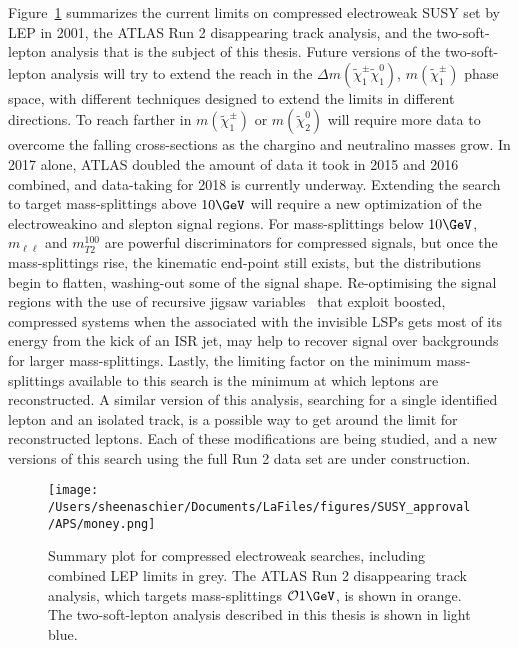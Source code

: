Figure~\ref{fig:final} summarizes the current limits on compressed electroweak SUSY set by LEP in 2001, the ATLAS Run 2 disappearing track analysis, and the two-soft-lepton analysis that is the subject of this thesis.  Future versions of the two-soft-lepton analysis will try to extend the reach in the $\Delta m(\tilde\chi_1^\pm\tilde\chi_1^0)$, $m(\tilde\chi_1^\pm)$ phase space, with different techniques designed to extend the limits in different directions.  To reach farther in $m(\tilde\chi_1^\pm)$ or $m(\tilde\chi_2^0)$ will require more data to overcome the falling cross-sections as the chargino and neutralino masses grow.  In 2017 alone, ATLAS doubled the amount of data it took in 2015 and 2016 combined, and data-taking for 2018 is currently underway.  Extending the search to target mass-splittings above $10\GeV$ will require a new optimization of the electroweakino and slepton signal regions.  For mass-splittings below $10\GeV$, $m_{\ell\ell}$ and $m_{T2}^{100}$ are powerful discriminators for compressed signals, but once the mass-splittings rise, the kinematic end-point still exists, but the distributions begin to flatten, washing-out some of the signal shape.  Re-optimising the signal regions with the use of recursive jigsaw variables~\cite{Jackson:2016mfb} that exploit boosted, compressed systems when the \met associated with the invisible LSPs gets most of its energy from the kick of an ISR jet, may help to recover signal over backgrounds for larger mass-splittings.  Lastly, the limiting factor on the minimum mass-splittings available to this search is the minimum \pt at which leptons are reconstructed.   A similar version of this analysis, searching for a single identified lepton and an isolated track, is a possible way to get around the \pt limit for reconstructed leptons.  Each of these modifications are being studied, and a new versions of this search using the full Run 2 data set are under construction.
 \begin{figure}%
  \begin{center}
  \texttt{[image: /Users/sheenaschier/Documents/LaFiles/figures/SUSY\_approval/APS/money.png]}
   \end{center}
 \caption{Summary plot for compressed electroweak searches, including combined LEP limits in grey.  The ATLAS Run 2 disappearing track analysis, which targets mass-splittings $\mathcal{O}1\GeV$, is shown in orange.  The two-soft-lepton analysis described in this thesis is shown in light blue.}
 \label{fig:final}
 \end{figure}
 




